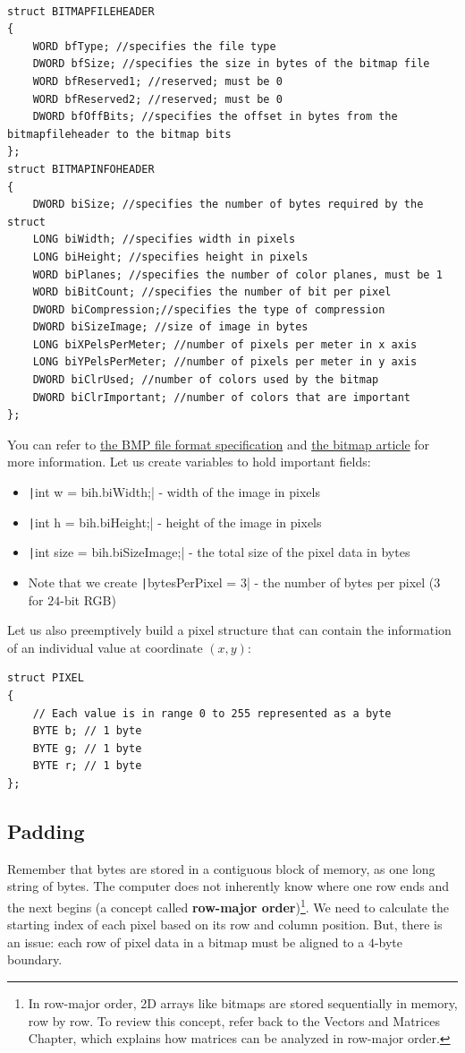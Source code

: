 \begin{verbatim}

struct BITMAPFILEHEADER
{
    WORD bfType; //specifies the file type
    DWORD bfSize; //specifies the size in bytes of the bitmap file
    WORD bfReserved1; //reserved; must be 0
    WORD bfReserved2; //reserved; must be 0
    DWORD bfOffBits; //specifies the offset in bytes from the bitmapfileheader to the bitmap bits
};
struct BITMAPINFOHEADER
{
    DWORD biSize; //specifies the number of bytes required by the struct
    LONG biWidth; //specifies width in pixels
    LONG biHeight; //specifies height in pixels
    WORD biPlanes; //specifies the number of color planes, must be 1
    WORD biBitCount; //specifies the number of bit per pixel
    DWORD biCompression;//specifies the type of compression
    DWORD biSizeImage; //size of image in bytes
    LONG biXPelsPerMeter; //number of pixels per meter in x axis
    LONG biYPelsPerMeter; //number of pixels per meter in y axis
    DWORD biClrUsed; //number of colors used by the bitmap
    DWORD biClrImportant; //number of colors that are important
};
\end{verbatim}

You can refer to \href{https://en.wikipedia.org/wiki/BMP_file_format}{the BMP file format specification} and \href{https://en.wikipedia.org/wiki/Bitmap}{the bitmap article} for more information. Let us create variables to hold important fields:
\begin{itemize}
    \item \texttt|int w = bih.biWidth;| - width of the image in pixels
    \item \texttt|int h = bih.biHeight;| - height of the image in pixels
    \item \texttt|int size = bih.biSizeImage;| - the total size of the pixel data in bytes
    \item Note that we create \texttt|bytesPerPixel = 3| - the number of bytes per pixel ($3$ for $24$-bit RGB)
\end{itemize}
Let us also preemptively build a pixel structure that can contain the information of an individual value at coordinate $(x,y)$:
\begin{verbatim}
struct PIXEL
{
    // Each value is in range 0 to 255 represented as a byte
    BYTE b; // 1 byte
    BYTE g; // 1 byte
    BYTE r; // 1 byte
};
\end{verbatim}
\subsection{Padding}
Remember that bytes are stored in a contiguous block of memory, as one long string of bytes. The computer does not inherently know where one row ends and the next begins (a concept called \textbf{row-major order})\footnote{In row-major order, 2D arrays like bitmaps are stored sequentially in memory, row by row. To review this concept, refer back to the Vectors and Matrices Chapter, which explains how matrices can be analyzed in row-major order.}. We need to calculate the starting index of each pixel based on its row and column position. But, there is an issue: each row of pixel data in a bitmap must be aligned to a $4$-byte boundary. 


